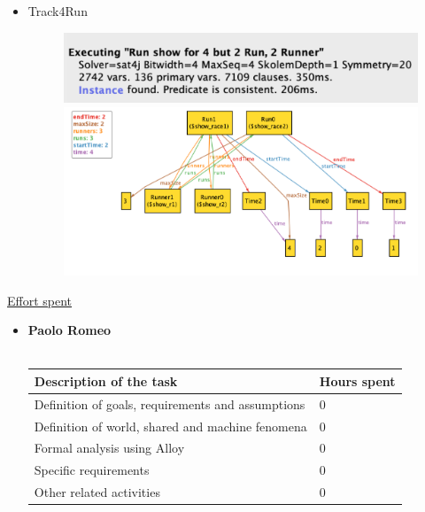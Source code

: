 \documentclass{article}
\begin{document}
\begin{legal}
\begin{itemize}
\begin{figure}[H]
			\end{figure}
			\newpage
			\item Track4Run
			\begin{figure}[H]
		  				\includegraphics[width=\linewidth]{./images/alloy/track4Run-Run.png}
		  				\includegraphics[width=\linewidth]{./images/alloy/track4Run-World.png}
			\end{figure}
		\end{itemize}
	\newpage
	\item \underline{Effort spent}\\
		{\normalfont
		\begin{itemize}
		\item \textbf{Paolo Romeo}\\\\
				\begin{tabular}{| m{9cm} | m{3cm}| }
				\hline
					\textbf{Description of the task} & \textbf{Hours spent}\\
				\hline
					Definition of goals, requirements and assumptions & 0 \\
				\hline
					Definition of world, shared and machine fenomena & 0 \\
				\hline
					Formal analysis using Alloy & 0 \\
				\hline
					Specific requirements & 0 \\
				\hline
					Other related activities & 0 \\
				\hline
				\end{tabular}
				\\\\\\

\end{itemize}}
\end{legal}
\end{document}
